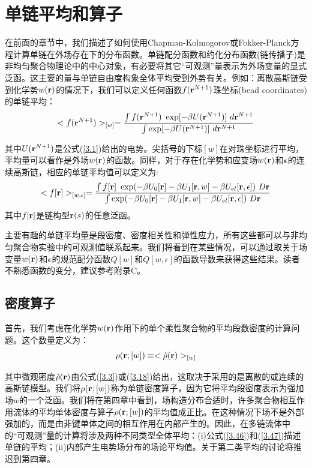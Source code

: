 \section{单链平均和算子}

在前面的章节中，我们描述了如何使用Chapman-Kolmogorov或Fokker-Planck方程计算单链在外场存在下的分布函数。单链配分函数和约化分布函数(链传播子)是非均匀聚合物理论中的中心对象，有必要将其它“可观测”量表示为外场变量的显式泛函。这主要的量与单链自由度构象全体平均受到外势有关。例如：离散高斯链受到化学势$w (\mathbf{r})$的情况下，我们可以定义任何函数$f(\mathbf{r}^{N+1})$珠坐标(bead coordinates)的单链平均：
\begin{equation}\label{3.46}
<f(\mathbf{r}^{N+1})>_{[w]}= \frac{\int  f(\mathbf{r}^{N+1})~\exp[-\beta U(\mathbf{r}^{N+1})]~d \mathbf{r}^{N+1}}{\int \exp[-\beta U(\mathbf{r}^{N+1})]~d\mathbf{r}^{N+1}}
\end{equation}

其中$U(\mathbf{r}^{N+1})$是公式(\ref{3.1})给出的电势。尖括号的下标$[w]$在对珠坐标进行平均，平均量可以看作是外场$w(\mathbf{r})$的函数。同样，对于存在化学势和应变场$w(\mathbf{r})$和$\mathbf{\epsilon}$的连续高斯链，相应的单链平均值可以定义为:
\begin{equation}\label{3.47}
<f[\mathbf{r}]>_{[w ,\epsilon]}=\frac{\int f[\mathbf{r}]~\exp(-\beta U_{0}[\mathbf{r}]-\beta U_{1}[\mathbf{r},w]-\beta U_{el}[\mathbf{r},\epsilon])~D\mathbf{r}}{\int \exp(-\beta U_{0}[\mathbf{r}]-\beta U_{1}[\mathbf{r},w]-\beta U_{el}[\mathbf{r},\epsilon])~D\mathbf{r}}
\end{equation}
其中$f[\mathbf{r}]$是链构型$\mathbf{r}(s)$的任意泛函。

主要有趣的单链平均量是段密度、密度相关性和弹性应力，所有这些都可以与非均匀聚合物实验中的可观测值联系起来。我们将看到在某些情况，可以通过取关于场变量$w(\mathbf{r})$和$\mathbf{\epsilon}$的规范配分函数$Q[w]$和$Q[w,\epsilon]$的函数导数来获得这些结果。读者不熟悉函数的变分，建议参考附录C。
\subsection{密度算子}
首先，我们考虑在化学势$w(\mathbf{r})$作用下的单个柔性聚合物的平均段数密度的计算问题。这个数量定义为：
\begin{equation}\label{3.48}
\rho(\mathbf{r};[w])\equiv<\tilde{\rho}(\mathbf{r})>_{[w]}
\end{equation}

其中微观密度$\tilde{\rho}(\mathbf{r})$由公式(\ref{3.3})或(\ref{3.18})给出，这取决于采用的是离散的或连续的高斯链模型。我们将$\rho(\mathbf{r};[w])$称为单链密度算子，因为它将平均段密度表示为强加场$w$的一个泛函。我们将在第四章中看到，场构造分布合适时，许多聚合物相互作用流体的平均单体密度与算子$\rho(\mathbf{r};[w])$的平均值成正比。在这种情况下场不是外部强加的，而是由非键单体之间的相互作用在内部产生的。因此，在多链流体中的“可观测”量的计算将涉及两种不同类型全体平均：(i)公式(\ref{3.46})和(\ref{3.47})描述单链的平均；(ii)内部产生电势场分布的场论平均值。关于第二类平均的讨论将推迟到第四章。

